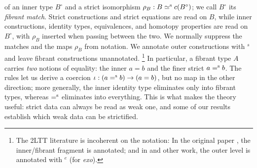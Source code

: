 of an inner type $B^\circ$ and a strict isomorphism
$\rho_B:B\mathrel{\simeq^\textup{s}} c(B^\circ)$; we call $B^\circ$ its \emph{fibrant match}.
Strict constructions and strict equations are read
on $B$, while inner constructions, identity types, equivalences, and homotopy
properties are read on $B^\circ$, with $\rho_B$ inserted when passing between
the two. We normally suppress the matches and the maps $\rho_B$ from notation.
We annotate outer constructions with ${}^s$ and leave fibrant constructions unannotated.%
\footnote{The 2LTT literature is incoherent on the notation: In the original paper \citep{2LTT}, the inner/fibrant fragment is annotated; and in \citet{ahrens2025univalence} and other work, the outer level is annotated with ${}^e$ (for \emph{exo}).}
%
In particular, a fibrant
type $A$ carries \emph{two} notions of equality: the inner $a=b$ and the finer
strict $a\mathrel{=^\textup{s}} b$. The rules let us derive a coercion $\iota:(a\mathrel{=^\textup{s}} b)\to(a=b)$, but no map
in the other direction; more generally, the inner identity type eliminates
only into fibrant types, whereas $\mathrel{=^\textup{s}}$ eliminates into everything. This
is what makes the theory useful: strict data can always be
read as weak one, and some of our results establish which weak data can be strictified.


